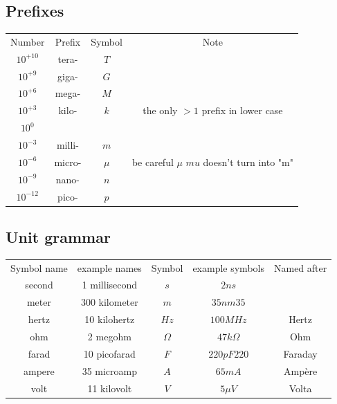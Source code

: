 \documentclass{article}
\begin{document}
\subsection{Prefixes}
\begin{center}
\begin{tabular}{ c c c c }
 Number    & Prefix & Symbol & Note \\
 $10^{+10}$ & tera-  & $T$    &   \\
 $10^{+9}$  & giga-  & $G$    &   \\
 $10^{+6}$  & mega-  & $M$    &   \\
 $10^{+3}$  & kilo-  & $k$    & the only $> 1$ prefix in lower case \\
 $10^{0}$   &        &        &   \\
 $10^{-3}$  & milli- & $m$    &   \\
 $10^{-6}$  & micro- & $\mu$  &  be careful $\mu$ \(mu\) doesn't turn into "m" \\
 $10^{-9}$  & nano-  & $n$    &   \\
 $10^{-12}$ & pico-  & $p$    &   \\
\end{tabular}
\end{center}

\subsection{Unit grammar}
\begin{center}
\begin{tabular}{ c c c c c }
 Symbol name & example names & Symbol & example symbols & Named after \\
 second & 1 millisecond & $s$      & $2 ns$       &    \\
 meter  & 300 kilometer & $m$      & $35 nm35$    &    \\
 hertz  & 10 kilohertz  & $Hz$     & $100 MHz$    &  Hertz  \\
 ohm    & 2 megohm      & $\Omega$ & $47 k\Omega$ &  Ohm  \\
 farad  & 10 picofarad  & $F$      & $220 pF220$  &  Faraday  \\
 ampere & 35 microamp   & $A$      & $65 mA$      &  Ampère  \\
 volt   & 11 kilovolt   & $V$      & $5\mu{V}$    &  Volta  \\
\end{tabular}
\end{center}

\end{document}
